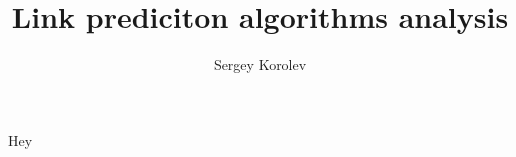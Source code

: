 \documentclass[12pt]{article}
\title{Link prediciton algorithms analysis}
\author{Sergey Korolev}
\begin{document}
	Hey
\end{document}
